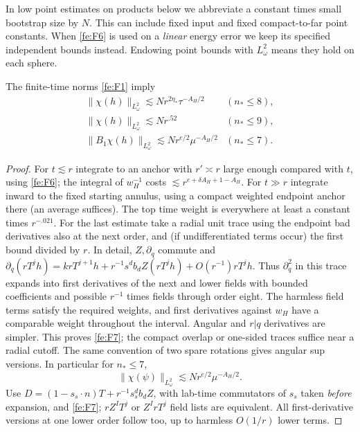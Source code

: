 In low point estimates on products below we abbreviate a constant times small bootstrap size by \(N\). This can include fixed input and fixed compact-to-far point constants. When \eqref{fe:F6} is used on a \emph{linear} energy error we keep its specified independent bounds instead. Endowing point bounds with \(L^2_\omega\) means they hold on each sphere.

\begin{lemma}\label{fe:point-estimates}
The finite-time norms \eqref{fe:F1} imply
\begin{equation}\label{fe:F7}
\begin{array}{ll}
 \|\chi(h)\|_{L^2_\omega}\lesssim N r^{2\eta_*}\tau^{-A_H/2}
                          & (n_*\le8),\\
 \|\chi(h)\|_{L^2_\omega}\lesssim N r^{.52}
                          & (n_*\le9),\\
 \|B_1\chi(h)\|_{L^2_\omega}\lesssim N r^{e/2}\mu^{-A_H/2}
                          & (n_*\le7).
 \end{array}
\end{equation}
\end{lemma}

\begin{proof}
For \(t\lesssim r\) integrate to an anchor with \(r'\asymp r\) large enough compared with \(t\), using \eqref{fe:F6}; the integral of \(w_H^{-1}\) costs \(\lesssim r^{e+\delta A_H+1-A_H}\). For \(t\gg r\) integrate inward to the fixed starting annulus, using a compact weighted endpoint anchor there (an average suffices). The top time weight is everywhere at least a constant times \(r^{-.021}\). For the last estimate take a radial unit trace using the endpoint bad derivatives also at the next order, and (if undifferentiated terms occur) the first bound divided by \(r\). In detail, \(Z,\partial_q\) commute and \(\partial_q(rT^j h)=k r T^{j+1}h+r^{-1}s^d b_dZ(rT^j h)+O(r^{-1})rT^j h\). Thus \(\partial_q^2\) in this trace expands into first derivatives of the next and lower fields with bounded coefficients and possible \(r^{-1}\) times fields through order eight. The harmless field terms satisfy the required weights, and first derivatives against \(w_H\) have a comparable weight throughout the interval. Angular and \(r|q\) derivatives are simpler. This proves \eqref{fe:F7}; the compact overlap or one-sided traces suffice near a radial cutoff. The same convention of two spare rotations gives angular sup versions. In particular for \(n_*\le7\),
\begin{equation}\label{fe:F8}
\|\chi(\psi)\|_{L^2_\omega}
           \lesssim N r^{e/2}\mu^{-A_H/2}.
\end{equation}
Use \(D=(1-s_s\cdot n)T+r^{-1}s_s^d b_dZ\), with lab-time commutators of \(s_s\) taken \emph{before} expansion, and \eqref{fe:F7}; \(rZ^IT^j\) or \(Z^I rT^j\) field lists are equivalent. All first-derivative versions at one lower order follow too, up to harmless \(O(1/r)\) lower terms.
\end{proof}

